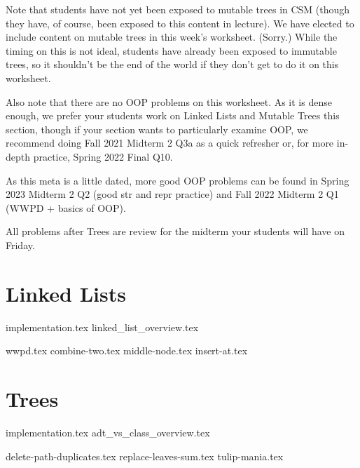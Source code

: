 \documentclass{exam}
\begin{document}
\begin{meta}
    Note that students have not yet been exposed to mutable trees in CSM (though they have, of course, been exposed to this content in lecture). We have elected to include content on mutable trees in this week's worksheet. (Sorry.) While the timing on this is not ideal, students have already been exposed to immutable trees, so it shouldn't be the end of the world if they don't get to do it on this worksheet.

    Also note that there are no OOP problems on this worksheet. As it is dense enough, we prefer your students work on Linked Lists and Mutable Trees this section, though if your section wants to particularly examine OOP, we recommend doing Fall 2021 Midterm 2 Q3a as a quick refresher or, for more in-depth practice, Spring 2022 Final Q10.
    
    As this meta is a little dated, more good OOP problems can be found in Spring 2023 Midterm 2 Q2 (good str and repr practice) and Fall 2022 Midterm 2 Q1 (WWPD + basics of OOP).
    
    All problems after Trees are review for the midterm your students will have on Friday.
\end{meta}

\section{Linked Lists}
    {implementation.tex}
    {linked_list_overview.tex}
\begin{questions}
    {wwpd.tex}
    {combine-two.tex}
    {middle-node.tex}
    \newpage
    {insert-at.tex}
\end{questions}

\newpage
\section{Trees}
{implementation.tex}
{adt_vs_class_overview.tex}
\newpage
\begin{questions}
    {delete-path-duplicates.tex}
    \newpage
    {replace-leaves-sum.tex}
    \newpage
    {tulip-mania.tex}
\end{questions}
\end{document}
